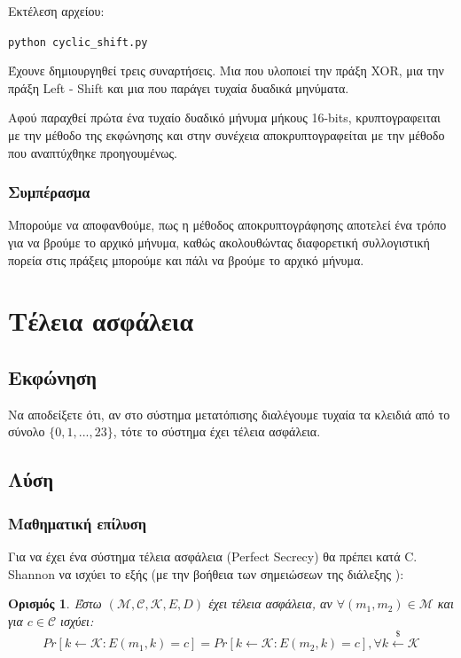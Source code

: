 \documentclass[oneside]{article}
\let\t\texttt
\newtheorem*{definition}{Ορισμός}
\begin{document}
Εκτέλεση αρχείου:

\begin{center}
    \t{python cyclic_shift.py}
\end{center}

Έχουνε δημιουργηθεί τρεις συναρτήσεις. Μια που υλοποιεί την πράξη XOR, μια την πράξη Left - Shift και μια που παράγει τυχαία δυαδικά μηνύματα. 

Αφού παραχθεί πρώτα ένα τυχαίο δυαδικό μήνυμα μήκους 16-bits, κρυπτογραφειται με την μέθοδο της εκφώνησης και στην συνέχεια αποκρυπτογραφείται με την μέθοδο που αναπτύχθηκε προηγουμένως.

\subsubsection{Συμπέρασμα}

Μπορούμε να αποφανθούμε, πως η μέθοδος αποκρυπτογράφησης αποτελεί ένα τρόπο για να βρούμε το αρχικό μήνυμα, καθώς ακολουθώντας διαφορετική συλλογιστική πορεία στις πράξεις μπορούμε και πάλι να βρούμε το αρχικό μήνυμα.

\section{Τέλεια ασφάλεια}

\subsection{Εκφώνηση}

Να αποδείξετε ότι, αν στο σύστημα μετατόπισης διαλέγουμε τυχαία τα κλειδιά από το σύνολο $\{0, 1, ..., 23\}$, τότε το σύστημα έχει τέλεια ασφάλεια.

\subsection{Λύση} 

\subsubsection{Μαθηματική επίλυση}

Για να έχει ένα σύστημα τέλεια ασφάλεια (Perfect Secrecy) θα πρέπει κατά C. Shannon να ισχύει το εξής (με την βοήθεια των σημειώσεων της διάλεξης \cite{sj}): 

\begin{definition}
    Έστω $(\mathcal{M}, \mathcal{C}, \mathcal{K}, E, D)$ έχει τέλεια ασφάλεια, αν $\forall (m_1, m_2) \in \mathcal{M}$ και για $c \in \mathcal{C}$ ισχύει:
    \begin{equation}
        Pr[k \leftarrow \mathcal{K}: E(m_1, k) = c] = Pr[k \leftarrow \mathcal{K}: E(m_2, k) = c], \forall k \stackrel{\$}{\leftarrow} \mathcal{K}
    \end{equation}
\end{definition}
\end{document}
